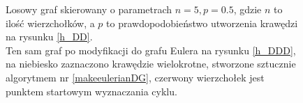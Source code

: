 \documentclass[a4paper, 12pt, twoside, openright]{article}
\begin{document}
	\captionsetup{justification=centering}	
	\begin{figure}[!h]
		\centering
				\quad
		
		\caption[]{Losowy graf skierowany o parametrach $n=5, p=0.5$, gdzie $n$ to ilość wierzchołków, a $p$ to prawdopodobieństwo utworzenia krawędzi na rysunku \ref{h_DD}.\\Ten sam graf po modyfikacji do grafu Eulera na rysunku \ref{h_DDD}, na niebiesko zaznaczono krawędzie wielokrotne, stworzone sztucznie algorytmem nr \ref{makeeulerianDG}, czerwony wierzchołek jest punktem startowym wyznaczania cyklu.}
		\label{h_Dgraph}
	\end{figure}	
\end{document}

